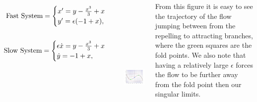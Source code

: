 \documentclass[14pt, a0paper, portrait]{tikzposter}
\begin{document}
\begin{columns}
{
\begin{minipage}{0.5\linewidth}
\begin{align*}{
\text{Fast System}=
    \begin{cases} x'=y-\frac{x^3}{3}+x\\
    y'=\epsilon(-1+ x),
    \end{cases}
}&\\
&\notag\\
{
\text{Slow System}= 
    \begin{cases} \epsilon \dot{x}=y-\frac{x^3}{3}+x\\
    \dot{y}=-1+x,
    \end{cases}
}\end{align*}\end{minipage}
\begin{minipage}{0.50\linewidth}
	\begin{tikzfigure}
		\includegraphics[height=8cm,width=10cm]{Images/vdPe02-Moment-big-e-pres.jpg}
	\end{tikzfigure}
\end{minipage}
From this figure it is easy to see the trajectory of the flow jumping between from the repelling to attracting branches, where the green squares are the fold points. We also note that having a relatively large $\epsilon$ forces the flow to be further away from the fold point then our singular limits.}


\end{columns}
\end{document}

